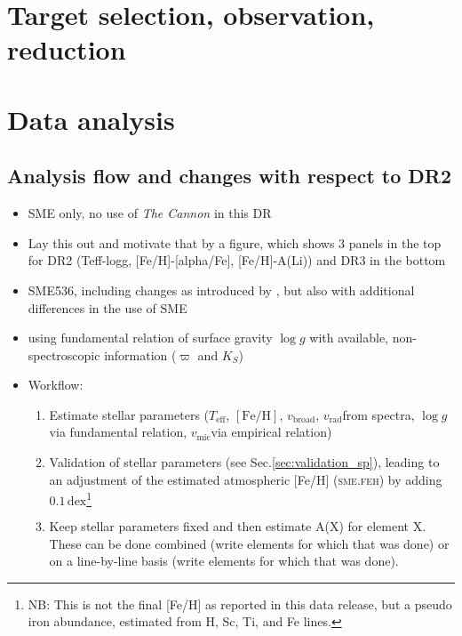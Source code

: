 \documentclass[fleqn,usenatbib,useAMS]{mnras}
\newcommand{\teff}{$T_\mathrm{eff}$}
\newcommand{\logg}{$\log g$}
\newcommand{\feh}{$\mathrm{[Fe/H]}$}
\newcommand{\vmic}{$v_\mathrm{mic}$}
\newcommand{\vbroad}{$v_\mathrm{broad}$}
\newcommand{\vrad}{$v_\mathrm{rad}$}
\begin{document}
\section{Target selection, observation, reduction} \label{sec:selection_observation_reduction}

\section{Data analysis} \label{sec:analysis}

\subsection{Analysis flow and changes with respect to DR2} \label{sec:analysis_flow}

\begin{itemize}
\item SME only, no use of \textit{The Cannon} in this DR
\item Lay this out and motivate that by a figure, which shows 3 panels in the top for DR2 (Teff-logg, [Fe/H]-[alpha/Fe], [Fe/H]-A(Li)) and DR3 in the bottom
\item SME536, including changes as introduced by \citet{Piskunov2018}, but also with additional differences in the use of SME
\item using fundamental relation of surface gravity $\log g$ with available, non-spectroscopic information ($\varpi$ and $K_S$)
\item Workflow: 
\begin{enumerate}
	\item Estimate stellar parameters (\teff, \feh, \vbroad, \vrad from spectra, \logg via fundamental relation, \vmic via empirical relation)
	\item Validation of stellar parameters (see Sec.\ref{sec:validation_sp}), leading to an adjustment of the estimated atmospheric [Fe/H] (\textsc{sme.feh}) by adding $0.1\,\mathrm{dex}$\footnote{NB: This is not the final [Fe/H] as reported in this data release, but a pseudo iron abundance, estimated from H, Sc, Ti, and Fe lines.}
	\item Keep stellar parameters fixed and then estimate A(X) for element X. These can be done combined (write elements for which that was done) or on a line-by-line basis (write elements for which that was done).
\end{enumerate}
\end{itemize}
\end{document}

